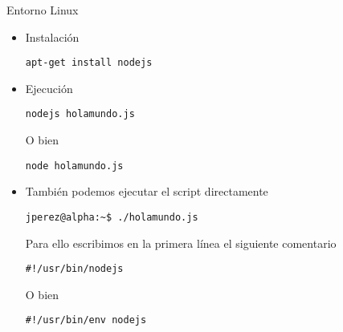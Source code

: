 \documentclass[ucs]{beamer}
\begin{document}
\begin{frame}[fragile]
\frametitle{}

Entorno Linux

    \begin{itemize}
    \item
Instalación 
  \begin{scriptsize}
  \begin{verbatim}
apt-get install nodejs
  \end{verbatim}
  \end{scriptsize}

    \item
Ejecución 

  \begin{scriptsize}
  \begin{verbatim}
nodejs holamundo.js
  \end{verbatim}
  \end{scriptsize}

O bien
  \begin{scriptsize}
  \begin{verbatim}
node holamundo.js
  \end{verbatim}
  \end{scriptsize}


    \item
También podemos ejecutar el script directamente 

  \begin{scriptsize}
  \begin{verbatim}
jperez@alpha:~$ ./holamundo.js
  \end{verbatim}
  \end{scriptsize}

Para ello escribimos en la primera línea el siguiente comentario
  \begin{scriptsize}
  \begin{verbatim}
#!/usr/bin/nodejs
  \end{verbatim}
  \end{scriptsize}
O bien
  \begin{scriptsize}
  \begin{verbatim}
#!/usr/bin/env nodejs
  \end{verbatim}
  \end{scriptsize}


\end{itemize}

\end{frame}
\end{document}
